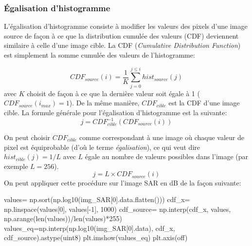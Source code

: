 \documentclass[
  11pt,
  letterpaper,
  open=any,
  twoside=false,
  french]{scrbook}
\newenvironment{Shaded}{\begin{snugshade}}{\end{snugshade}}
\newcommand{\BuiltInTok}[1]{\textcolor[rgb]{0.00,0.23,0.31}{#1}}
\newcommand{\DecValTok}[1]{\textcolor[rgb]{0.68,0.00,0.00}{#1}}
\newcommand{\NormalTok}[1]{\textcolor[rgb]{0.00,0.23,0.31}{#1}}
\newcommand{\OperatorTok}[1]{\textcolor[rgb]{0.37,0.37,0.37}{#1}}
\newcommand{\StringTok}[1]{\textcolor[rgb]{0.13,0.47,0.30}{#1}}
\begin{document}
\subsubsection{Égalisation
d'histogramme}\label{uxe9galisation-dhistogramme}

L'égalisation d'histogramme consiste à modifier les valeurs des pixels
d'une image source de façon à ce que la distribution cumulée des valeurs
(CDF) deviennent similaire à celle d'une image cible. La CDF
(\emph{Cumulative Distribution Function}) est simplement la somme
cumulée des valeurs de l'histogramme:

\[
CDF_{source}(i)= \frac{1}{K}\sum_{j=0}^{j \leq i} hist_{source}(j)
\] avec \(K\) choisit de façon à ce que la dernière valeur soit égale à
1 (\(CDF_{source}(i_{max})=1\)). De la même manière, \(CDF_{cible}\) est
la CDF d'une image cible. La formule générale pour l'égalisation
d'histogramme est la suivante: \[
j = CDF_{cible}^{-1}(CDF_{source}(i))
\]

On peut choisir \(CDF_{cible}\) comme correspondant à une image où
chaque valeur de pixel est équiprobable (d'où le terme
\emph{égalisation}), ce qui veut dire \(hist_{cible}(j)=1/L\) avec \(L\)
égale au nombre de valeurs possibles dans l'image (par exemple
\(L=256\)). \[
j = L \times CDF_{source}(i)
\] On peut appliquer cette procédure sur l'image SAR en dB de la façon
suivante:

\begin{Shaded}
\begin{Highlighting}[]
\NormalTok{values}\OperatorTok{=}\NormalTok{ np.sort(np.log10(img\_SAR[}\DecValTok{0}\NormalTok{].data.flatten()))}
\NormalTok{cdf\_x}\OperatorTok{=}\NormalTok{ np.linspace(values[}\DecValTok{0}\NormalTok{], values[}\OperatorTok{{-}}\DecValTok{1}\NormalTok{], }\DecValTok{1000}\NormalTok{)}
\NormalTok{cdf\_source}\OperatorTok{=}\NormalTok{ np.interp(cdf\_x, values, np.arange(}\BuiltInTok{len}\NormalTok{(values))}\OperatorTok{/}\BuiltInTok{len}\NormalTok{(values)}\OperatorTok{*}\DecValTok{255}\NormalTok{)}
\NormalTok{values\_eq}\OperatorTok{=}\NormalTok{np.interp(np.log10(img\_SAR[}\DecValTok{0}\NormalTok{].data), cdf\_x, cdf\_source).astype(}\StringTok{\textquotesingle{}uint8\textquotesingle{}}\NormalTok{)}
\NormalTok{plt.imshow(values\_eq)}
\NormalTok{plt.axis(}\StringTok{\textquotesingle{}off\textquotesingle{}}\NormalTok{)}
\end{Highlighting}
\end{Shaded}
\end{document}
